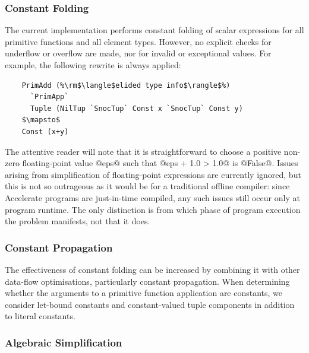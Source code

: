 \subsubsection{Constant Folding}

The current implementation performs constant folding of scalar expressions for
all primitive functions and all element types. However, no explicit checks for
underflow or overflow are made, nor for invalid or exceptional values. For
example, the following rewrite is always applied:
%
%
\begin{lstlisting}[style=Haskell,numbers=none,mathescape]
%\bf$\langle$ constant folding $\rangle$%
    PrimAdd (%\rm$\langle$elided type info$\rangle$%)
      `PrimApp`
      Tuple (NilTup `SnocTup` Const x `SnocTup` Const y)
    $\mapsto$
    Const (x+y)
\end{lstlisting}
%
The attentive reader will note that it is straightforward to choose a positive
non-zero floating-point value @eps@ such that @eps + 1.0 > 1.0@ is
@False@. Issues arising from simplification of floating-point expressions
are currently ignored, but this is not so outrageous as it would be for a
traditional offline compiler: since Accelerate programs are just-in-time
compiled, any such issues still occur only at program runtime. The only
distinction is from which phase of program execution the problem manifests, not
that it does.



\subsubsection{Constant Propagation}

The effectiveness of constant folding can be increased by combining it with
other data-flow optimisations, particularly constant propagation. When
determining whether the arguments to a primitive function application are
constants, we consider let-bound constants and constant-valued tuple components
in addition to literal constants.


\subsubsection{Algebraic Simplification}

